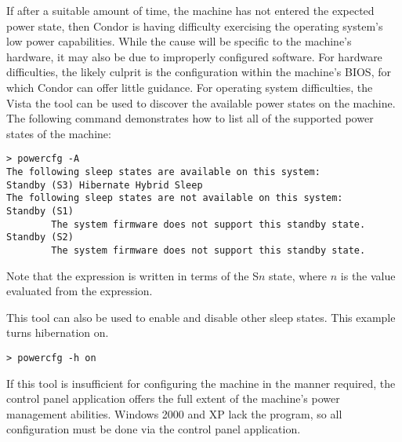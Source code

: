 If after a suitable amount of time,
the machine has not entered the expected power state,
then Condor is having difficulty exercising the operating system's
low power capabilities.  
While the cause will be specific to the machine's hardware,
it may also be due to improperly configured software.  
For hardware difficulties,
the likely culprit is the configuration within the machine's BIOS,
for which Condor can offer little guidance.
For operating system difficulties,
the Vista the  tool can be used to discover the available 
power states on the machine.
The following command demonstrates how to
list all of the supported power states of the machine:

\begin{verbatim}
> powercfg -A
The following sleep states are available on this system: 
Standby (S3) Hibernate Hybrid Sleep
The following sleep states are not available on this system:
Standby (S1)
        The system firmware does not support this standby state.
Standby (S2)
        The system firmware does not support this standby state.
\end{verbatim}

Note that the  expression is written in terms of the 
S$n$ state, where $n$ is the value evaluated from the expression.

This tool can also be used to enable and disable other sleep states.
This example turns hibernation on.

\begin{verbatim}
> powercfg -h on
\end{verbatim}

If this tool is insufficient for configuring the machine in the manner required,
the  control panel application offers
the full extent of the machine's power management abilities.
Windows 2000 and XP lack the  program,
so all configuration must be done via the 
control panel application.

